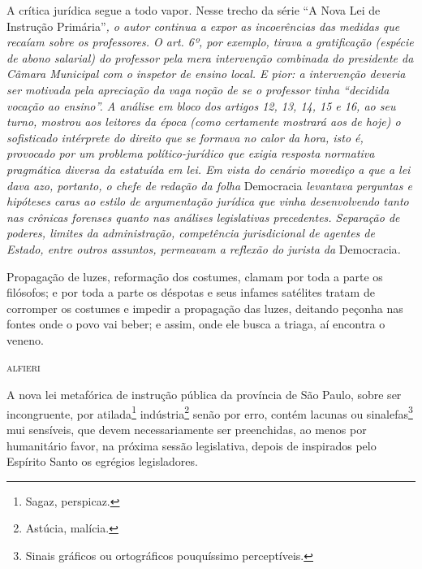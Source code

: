 \begin{didascalia}
A crítica jurídica segue a todo vapor. Nesse trecho da série ``A Nova
Lei de Instrução Primária''\emph{, o autor continua a expor as
incoerências das medidas que recaíam sobre os professores. O art. 6º,
por exemplo, tirava a gratificação (espécie de abono salarial) do
professor pela mera intervenção combinada do presidente da Câmara
Municipal com o inspetor de ensino local. E pior: a intervenção deveria
ser motivada pela apreciação da vaga noção de se o professor tinha
``decidida vocação ao ensino''. A análise em bloco dos artigos 12, 13, 14,
15 e 16, ao seu turno, mostrou aos leitores da época (como certamente
mostrará aos de hoje) o sofisticado intérprete do direito que se formava
no calor da hora, isto é, provocado por um problema político-jurídico
que exigia resposta normativa pragmática diversa da estatuída em lei. Em
vista do cenário movediço a que a lei dava azo, portanto, o chefe de
redação da folha} Democracia \emph{levantava perguntas e hipóteses caras
ao estilo de argumentação jurídica que vinha desenvolvendo tanto nas
crônicas forenses quanto nas análises legislativas precedentes.
Separação de poderes, limites da administração, competência
jurisdicional de agentes de Estado, entre outros assuntos, permeavam a
reflexão do jurista da} Democracia\emph{.}
\end{didascalia}



\epigraph{Propagação de luzes, reformação dos costumes, clamam por toda a parte os
filósofos; e por toda a parte os déspotas e seus infames satélites
tratam de corromper os costumes e impedir a propagação das luzes,
deitando peçonha nas fontes onde o povo vai beber; e assim, onde ele
busca a triaga,\footnotemark{} aí encontra o veneno.}{\textsc{alfieri}\footnotemark}



A nova lei metafórica de instrução pública da província de São Paulo,
sobre ser incongruente, por atilada\footnote{Sagaz, perspicaz.}
indústria\footnote{Astúcia, malícia.} senão por erro, contém lacunas
ou sinalefas\footnote{Sinais gráficos ou ortográficos pouquíssimo
  perceptíveis.} mui sensíveis, que devem necessariamente ser
preenchidas, ao menos por humanitário favor, na próxima sessão
legislativa, depois de inspirados pelo Espírito Santo os egrégios
legisladores.

